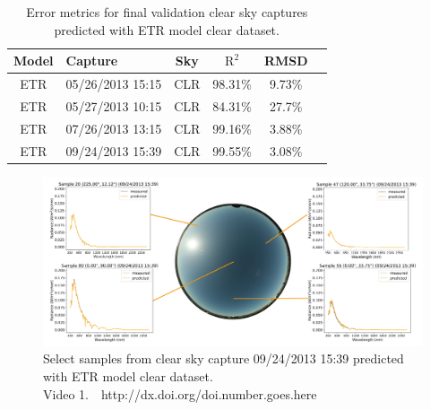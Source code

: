 \begin{table}[hbtp]
\caption{Error metrics for final validation clear sky captures predicted with ETR model clear dataset.}
\label{tab:resultsETRclear}
\centering      
\begin{tabular}{cl*{4}{c}}
    \\
    \toprule
    Model & Capture & Sky & $\mathrm{R}^2$ & RMSD\\
    \midrule
    \rule[-1ex]{0pt}{3.5ex}  ETR & 05/26/2013 15:15 & CLR & 98.31\% & 9.73\% \\
    \rule[-1ex]{0pt}{3.5ex}  ETR & 05/27/2013 10:15 & CLR & 84.31\% & 27.7\% \\
    \rule[-1ex]{0pt}{3.5ex}  ETR & 07/26/2013 13:15 & CLR & 99.16\% & 3.88\% \\
    \rule[-1ex]{0pt}{3.5ex}  ETR & 09/24/2013 15:39 & CLR & 99.55\% & 3.08\% \\
    \bottomrule
\end{tabular}
\end{table}

\begin{figure} [hbtp]
\begin{center}
\includegraphics[width=1.0\textwidth]{img/09242013_samples.jpg}
\end{center}
\caption[errorcurves] { \label{fig:errorcurves}Select samples from clear sky capture 09/24/2013 15:39 predicted with ETR model clear dataset. \\ Video 1.~~http://dx.doi.org/doi.number.goes.here}
\end{figure}

